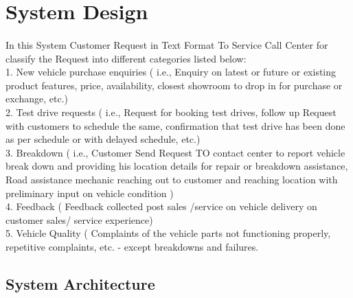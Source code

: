 \section{System Design}

\paragraph{}In this System Customer Request in Text Format To Service Call Center for classify the Request into different categories listed below:\\
1. New vehicle purchase enquiries ( i.e., Enquiry on latest or future or existing product features, price, availability, closest showroom to drop in for purchase or exchange, etc.)\\
2. Test drive requests ( i.e., Request for booking test drives, follow up Request with customers to schedule the same, confirmation that test drive has been done as per schedule or with delayed schedule, etc.)\\
3. Breakdown ( i.e., Customer Send Request TO  contact center to report vehicle break down and providing his location details for repair or breakdown assistance, Road assistance mechanic reaching out to customer and reaching location with preliminary input on vehicle condition )\\
4. Feedback ( Feedback collected post sales /service on vehicle delivery on customer sales/ service experience)\\
5. Vehicle Quality ( Complaints of the vehicle parts not functioning properly, repetitive complaints, etc. - except breakdowns and failures.\\



\subsection{System Architecture}
